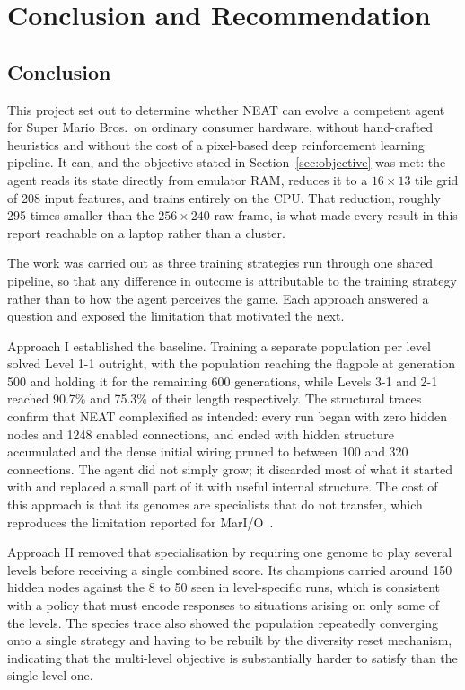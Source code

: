 \chapter{Conclusion and Recommendation}
\label{ch:conclusion}

\section{Conclusion}
\label{sec:conclusion}

This project set out to determine whether NEAT can evolve a competent agent for
Super Mario Bros.\ on ordinary consumer hardware, without hand-crafted
heuristics and without the cost of a pixel-based deep reinforcement learning
pipeline. It can, and the objective stated in
Section~\ref{sec:objective} was met: the agent reads its state directly from
emulator RAM, reduces it to a $16 \times 13$ tile grid of 208 input features,
and trains entirely on the CPU. That reduction, roughly 295 times smaller than
the $256 \times 240$ raw frame, is what made every result in this report
reachable on a laptop rather than a cluster.

\noindent
The work was carried out as three training strategies run through one shared
pipeline, so that any difference in outcome is attributable to the training
strategy rather than to how the agent perceives the game. Each approach
answered a question and exposed the limitation that motivated the next.

\noindent
Approach I established the baseline. Training a separate population per level
solved Level 1-1 outright, with the population reaching the flagpole at
generation 500 and holding it for the remaining 600 generations, while Levels
3-1 and 2-1 reached 90.7\% and 75.3\% of their length respectively. The
structural traces confirm that NEAT complexified as intended: every run began
with zero hidden nodes and 1248 enabled connections, and ended with hidden
structure accumulated and the dense initial wiring pruned to between 100 and
320 connections. The agent did not simply grow; it discarded most of what it
started with and replaced a small part of it with useful internal structure.
The cost of this approach is that its genomes are specialists that do not
transfer, which reproduces the limitation reported for
MarI/O~\cite{sethbling2015}.

\noindent
Approach II removed that specialisation by requiring one genome to play several
levels before receiving a single combined score. Its champions carried around
150 hidden nodes against the 8 to 50 seen in level-specific runs, which is
consistent with a policy that must encode responses to situations arising on
only some of the levels. The species trace also showed the population
repeatedly converging onto a single strategy and having to be rebuilt by the
diversity reset mechanism, indicating that the multi-level objective is
substantially harder to satisfy than the single-level one.

